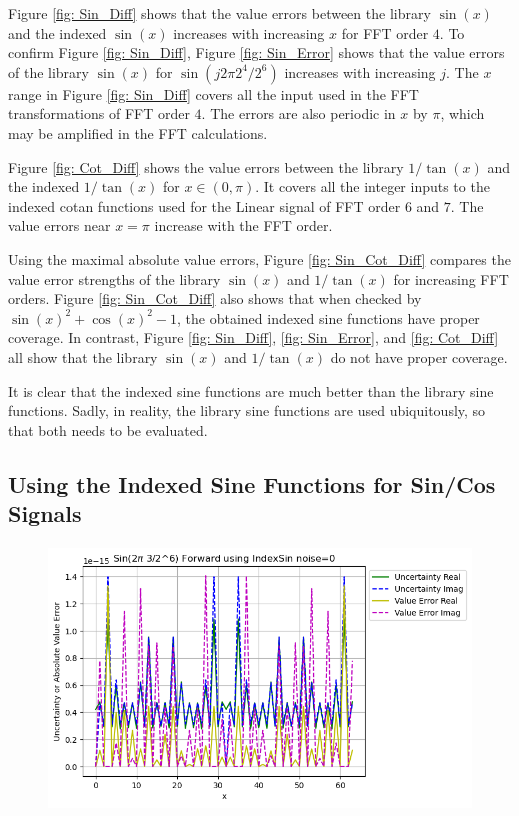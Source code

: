 \documentclass[twoside]{article}
\numberwithin{equation}{section}
\begin{document}
Figure \ref{fig: Sin_Diff} shows that the value errors between the library $\sin(x)$ and the indexed $\sin(x)$ increases with increasing $x$ for FFT order $4$.
To confirm Figure \ref{fig: Sin_Diff}, Figure \ref{fig: Sin_Error} shows that the value errors of the library $\sin(x)$ for $\sin(j 2\pi 2^4/2^6)$ increases with increasing $j$. 
The $x$ range in Figure \ref{fig: Sin_Diff} covers all the input used in the FFT transformations of FFT order $4$.
The errors are also periodic in $x$ by $\pi$, which may be amplified in the FFT calculations.

Figure \ref{fig: Cot_Diff} shows the value errors between the library $1/\tan(x)$ and the indexed $1/\tan(x)$ for $x \in (0, \pi)$.
It covers all the integer inputs to the indexed cotan functions used for the Linear signal of FFT order $6$ and $7$.
The value errors near $x = \pi$ increase with the FFT order.

Using the maximal absolute value errors, Figure \ref{fig: Sin_Cot_Diff} compares the value error strengths of the library $\sin(x)$ and $1/\tan(x)$ for increasing FFT orders.
Figure \ref{fig: Sin_Cot_Diff} also shows that when checked by $\sin(x)^2 + \cos(x)^2 - 1$, the obtained indexed sine functions have proper coverage.
In contrast, Figure \ref{fig: Sin_Diff}, \ref{fig: Sin_Error}, and \ref{fig: Cot_Diff} all show that the library $\sin(x)$ and $1/\tan(x)$ do not have proper coverage.

It is clear that the indexed sine functions are much better than the library sine functions.
Sadly, in reality, the library sine functions are used ubiquitously, so that both needs to be evaluated.

\subsection{Using the Indexed Sine Functions for Sin/Cos Signals}

\begin{figure}[p]
\includegraphics[height=2.75in]{FFT_Sin_Clean_6_3_Spec_Indexed.png} 
\label{fig: FFT_Sin_Clean_6_3_Spec_Indexed}
\end{figure}
\end{document}
